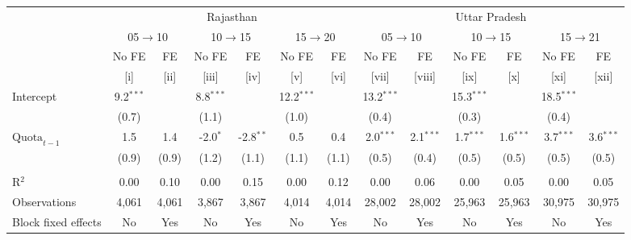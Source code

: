 
\begingroup
\centering
\scriptsize
\begin{adjustbox}{max width=\linewidth}
   \begin{threeparttable}[b]
      \begin{tabular}{lcccccccccccc}
         \toprule
          & \multicolumn{6}{c}{Rajasthan} & \multicolumn{6}{c}{Uttar Pradesh} \\
          & \multicolumn{2}{c}{05$\rightarrow$10} & \multicolumn{2}{c}{10$\rightarrow$15} & \multicolumn{2}{c}{15$\rightarrow$20} & \multicolumn{2}{c}{05$\rightarrow$10} & \multicolumn{2}{c}{10$\rightarrow$15} & \multicolumn{2}{c}{15$\rightarrow$21} \\
                               & No FE       & FE    & No FE       & FE          & No FE        & FE    & No FE        & FE          & No FE        & FE          & No FE        & FE \\
                               & [i]         & [ii]  & [iii]       & [iv]        & [v]          & [vi]  & [vii]        & [viii]      & [ix]         & [x]         & [xi]         & [xii]\\
         \midrule
         Intercept             & 9.2$^{***}$ &       & 8.8$^{***}$ &             & 12.2$^{***}$ &       & 13.2$^{***}$ &             & 15.3$^{***}$ &             & 18.5$^{***}$ &   \\
                               & (0.7)       &       & (1.1)       &             & (1.0)        &       & (0.4)        &             & (0.3)        &             & (0.4)        &   \\
         $\text{Quota}_{t-1}$  & 1.5         & 1.4   & -2.0$^{*}$  & -2.8$^{**}$ & 0.5          & 0.4   & 2.0$^{***}$  & 2.1$^{***}$ & 1.7$^{***}$  & 1.6$^{***}$ & 3.7$^{***}$  & 3.6$^{***}$\\
                               & (0.9)       & (0.9) & (1.2)       & (1.1)       & (1.1)        & (1.1) & (0.5)        & (0.4)       & (0.5)        & (0.5)       & (0.5)        & (0.5)\\
          \\
         R$^2$                 & 0.00        & 0.10  & 0.00        & 0.15        & 0.00         & 0.12  & 0.00         & 0.06        & 0.00         & 0.05        & 0.00         & 0.05\\
         Observations          & 4,061       & 4,061 & 3,867       & 3,867       & 4,014        & 4,014 & 28,002       & 28,002      & 25,963       & 25,963      & 30,975       & 30,975\\
         Block fixed effects   & No          & Yes   & No          & Yes         & No           & Yes   & No           & Yes         & No           & Yes         & No           & Yes\\
         \bottomrule
      \end{tabular}


\end{threeparttable}
\end{adjustbox}
